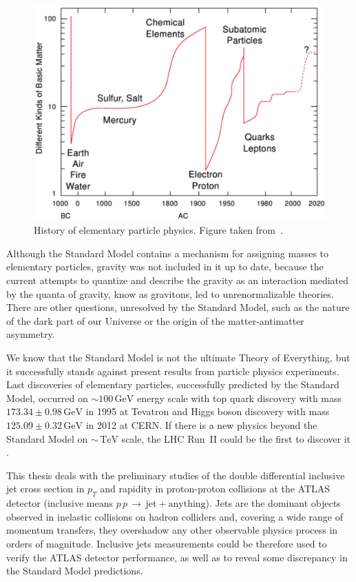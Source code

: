 \documentclass[a4paper,11pt,twoside,openright]{book}
\newcommand{\TeV}{\,\text{TeV}}
\newcommand{\GeV}{\,\text{GeV}}
\newcommand{\pt}{p_{T}}
\begin{document}
\begin{figure}[t]
  \centering
  \includegraphics[width=\textwidth]{Introduction/HistoryOfElementaryParticlePhysics.png}
  \caption[History of elementary particle physics.]{History of elementary
    particle physics. Figure taken from~\cite{LatticeQCDForPedestrians}.}
  \label{fig:HistoryOfElPartPhysics}
\end{figure}

Although the Standard Model contains a mechanism for assigning masses to
elementary particles, gravity was not included in it up
to date, because the current attempts to quantize and describe the gravity as an
interaction mediated by the quanta of gravity, know as gravitons, led to
unrenormalizable theories. There are other questions, unresolved by the Standard
Model, such as the nature of the dark part of our Universe or the origin of the
matter-antimatter asymmetry.

We know that the Standard Model is not the ultimate Theory of Everything,
but it successfully stands against present results from particle physics
experiments. 
Last discoveries of elementary particles, successfully predicted by the Standard
Model, occurred on $\sim 100\GeV$ energy scale with top quark discovery
\cite{TopQuark1,TopQuark2} with mass $173.34 \pm 0.98 \GeV$ in 1995 at Tevatron
and Higgs boson discovery \cite{HiggsDiscovery} with mass $125.09 \pm 0.32 \GeV$
in 2012 at CERN.
If there is a new physics beyond the Standard Model on $\sim \TeV$ scale, the
LHC Run~II could be the first to discover it \cite{PhysicsAtRun2LHC}. 

This thesis deals with the preliminary studies of the double differential inclusive jet 
cross section in $\pt$ and rapidity in proton-proton collisions at the ATLAS
detector (inclusive means
$p\,p\,\rightarrow\,\text{jet}+\text{anything}$). 
Jets are the dominant objects observed in inelastic collisions on hadron
colliders and, covering a wide range of momentum transfers, they overshadow any
other observable physics process in orders of magnitude.
Inclusive jets measurements could be therefore used to verify the ATLAS detector performance,
as well as to reveal some discrepancy in the Standard Model predictions.
\end{document}
